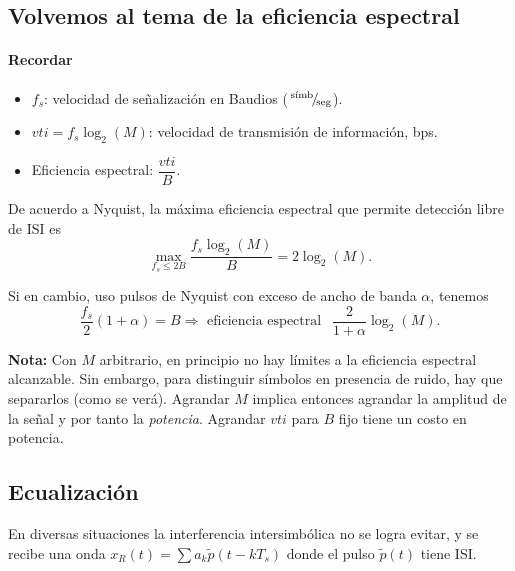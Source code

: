 \subsection*{Volvemos al tema de la eficiencia espectral}

\paragraph{Recordar}
    \begin{itemize}
        \item $f_s$: velocidad de señalización en Baudios
        ($\,^{\text{símb}}\!/\!_{\text{seg}}$).
        \item $vti = f_s \log_2 (M)$: velocidad de transmisión de información, bps.
        \item Eficiencia espectral: $\dfrac{vti}{B}$.
    \end{itemize}

   \noindent De acuerdo a Nyquist, la máxima eficiencia espectral que permite detección libre de ISI es
    \[\max_{f_s\leq 2B} \frac{f_s \log_2(M)}{B} = 2 \log_2 (M).\]

    \noindent Si en cambio, uso pulsos de Nyquist con exceso de ancho de banda $\alpha$, tenemos
    \[\frac{f_s}{2}(1+\alpha) = B \Rightarrow \text{ eficiencia espectral } \ \ \frac{2}{1+\alpha} \log_2 (M).\]

{\bf Nota:} Con $M$ arbitrario, en principio no hay límites a la
eficiencia espectral alcanzable. Sin embargo, para distinguir
símbolos en presencia de ruido, hay que separarlos (como se verá).
Agrandar $M$ implica entonces agrandar la amplitud de la señal y
por tanto la \emph{potencia}. Agrandar $vti$ para $B$ fijo tiene
un costo en potencia.
%
%

\subsection*{Ecualización}

En diversas situaciones la interferencia intersimbólica no se
logra evitar, y se recibe una onda $x_R(t) = \sum a_k
\tilde{p}(t-kT_s)$ donde el pulso $\tilde{p}(t)$ tiene ISI.

